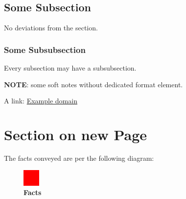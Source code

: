 \documentclass[american,paper=a4,captions=tableheading]{scrartcl}
\begin{document}
\hypertarget{some-subsection}{%
\subsection{Some Subsection}\label{some-subsection}}

No deviations from the section.

\hypertarget{some-subsubsection}{%
\subsubsection{Some Subsubsection}\label{some-subsubsection}}

Every subsection may have a subsubsection.

\textbf{NOTE}: some soft notes without dedicated format element.

A link: \href{https://example.com}{\color{some-blue}Example domain}

\newpage
\hypertarget{section-on-new-page}{%
\section{Section on new Page}\label{section-on-new-page}}

The facts conveyed are per the following diagram:

\setcapindent{0pt}

\begin{figure}
\centering
\includegraphics[width=0.93\linewidth]{images/facts.png}
\caption{\color{heading-color}\textbf{Facts}}
\end{figure}
\end{document}
